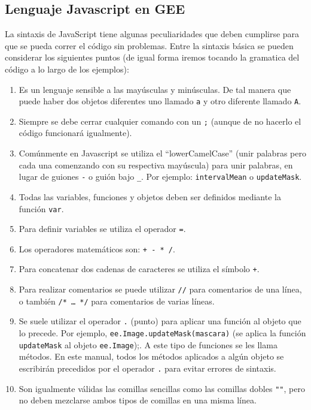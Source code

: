 \documentclass[
  12pt,
  letterpaper,
  twoside]{book}
\providecommand{\tightlist}{%
  \setlength{\itemsep}{0pt}\setlength{\parskip}{0pt}}
\begin{document}
\hypertarget{lenguaje-javascript-en-gee}{%
\subsection{Lenguaje Javascript en GEE}\label{lenguaje-javascript-en-gee}}

La sintaxis de JavaScript tiene algunas peculiaridades que deben cumplirse para que se pueda correr el código sin problemas. Entre la sintaxis básica se pueden considerar los siguientes puntos (de igual forma iremos tocando la gramatica del código a lo largo de los ejemplos):

\begin{enumerate}
\def\labelenumi{\arabic{enumi}.}
\tightlist
\item
  Es un lenguaje sensible a las mayúsculas y minúsculas. De tal manera que puede haber dos objetos diferentes uno llamado \texttt{a} y otro diferente llamado \texttt{A}.
\item
  Siempre se debe cerrar cualquier comando con un \texttt{;} (aunque de no hacerlo el código funcionará igualmente).
\item
  Comúnmente en Javascript se utiliza el ``lowerCamelCase'' (unir palabras pero cada una comenzando con su respectiva mayúscula) para unir palabras, en lugar de guiones \texttt{-} o guión bajo \texttt{\_}. Por ejemplo: \texttt{intervalMean} o \texttt{updateMask}.
\item
  Todas las variables, funciones y objetos deben ser definidos mediante la función \texttt{var}.
\item
  Para definir variables se utiliza el operador \texttt{=}.
\item
  Los operadores matemáticos son: \texttt{+\ -\ *\ /}.
\item
  Para concatenar dos cadenas de caracteres se utiliza el símbolo \texttt{+}.
\item
  Para realizar comentarios se puede utilizar \texttt{//} para comentarios de una línea, o también \texttt{/*\ \ldots{}\ */} para comentarios de varias líneas.
\item
  Se suele utilizar el operador \texttt{.} (punto) para aplicar una función al objeto que lo precede. Por ejemplo, \texttt{ee.Image.updateMask(mascara)} (se aplica la función \texttt{updateMask} al objeto \texttt{ee.Image});. A este tipo de funciones se les llama métodos. En este manual, todos los métodos aplicados a algún objeto se escribirán precedidos por el operador \texttt{.} para evitar errores de sintaxis.
\item
  Son igualmente válidas las comillas sencillas \texttt{\textquotesingle{}\textquotesingle{}} como las comillas dobles \texttt{""}, pero no deben mezclarse ambos tipos de comillas en una misma línea.
\end{enumerate}
\end{document}
